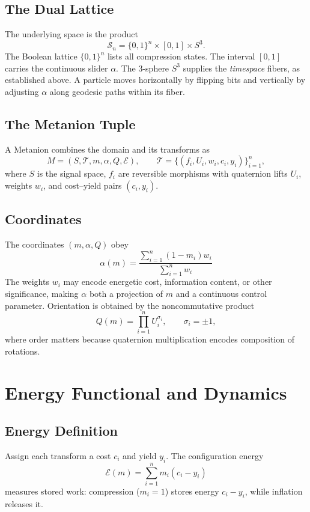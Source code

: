 \documentclass{article}
\begin{document}
\subsection{The Dual Lattice}
The underlying space is the product
\[
\mathcal{S}_n = \{0,1\}^n \times [0,1] \times S^3.
\]
The Boolean lattice $\{0,1\}^n$ lists all compression states. The interval $[0,1]$ carries the continuous slider $\alpha$. The 3-sphere $S^3$ supplies the \emph{timespace} fibers, as established above. A particle moves horizontally by flipping bits and vertically by adjusting $\alpha$ along geodesic paths within its fiber.

\subsection{The Metanion Tuple}
A Metanion combines the domain and its transforms as
\[
M = (S, \mathcal{T}, m, \alpha, Q, \mathcal{E}), \qquad \mathcal{T} = \{(f_i, U_i, w_i, c_i, y_i)\}_{i=1}^n,
\]
where $S$ is the signal space, $f_i$ are reversible morphisms with quaternion lifts $U_i$, weights $w_i$, and cost--yield pairs $(c_i,y_i)$.

\subsection{Coordinates}
The coordinates $(m,\alpha,Q)$ obey
\[
\alpha(m) = \frac{\sum_{i=1}^n (1-m_i) w_i}{\sum_{i=1}^n w_i}
\]
The weights $w_i$ may encode energetic cost, information content, or other significance, making $\alpha$ both a projection of $m$ and a continuous control parameter. Orientation is obtained by the non\textendash commutative product
\[
Q(m) = \prod_{i=1}^n U_i^{\sigma_i}, \qquad \sigma_i = \pm 1,
\]
where order matters because quaternion multiplication encodes composition of rotations.

\section{Energy Functional and Dynamics}

\subsection{Energy Definition}
Assign each transform a cost $c_i$ and yield $y_i$. The configuration energy
\[
\mathcal{E}(m) = \sum_{i=1}^n m_i(c_i - y_i)
\]
measures stored work: compression ($m_i=1$) stores energy $c_i - y_i$, while inflation releases it.
\end{document}
